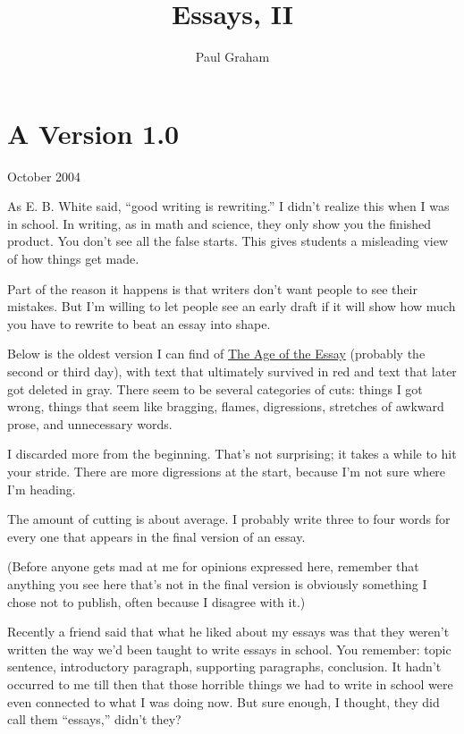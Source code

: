 \documentclass[12pt]{book}
\title{Essays, II}
\author{Paul Graham}
\date{}
\begin{document}
\frontmatter
\maketitle
\tableofcontents
\clearpage
\mainmatter

\chapter{A Version 1.0}

October 2004

As E. B. White said, ``good writing is rewriting.'' I didn't realize
this when I was in school. In writing, as in math and science, they only
show you the finished product. You don't see all the false starts. This
gives students a misleading view of how things get made.

Part of the reason it happens is that writers don't want people to see
their mistakes. But I'm willing to let people see an early draft if it
will show how much you have to rewrite to beat an essay into shape.

Below is the oldest version I can find of \href{essay.html}{The Age of
the Essay} (probably the second or third day), with text that ultimately
survived in red and text that later got deleted in gray. There seem to
be several categories of cuts: things I got wrong, things that seem like
bragging, flames, digressions, stretches of awkward prose, and
unnecessary words.

I discarded more from the beginning. That's not surprising; it takes a
while to hit your stride. There are more digressions at the start,
because I'm not sure where I'm heading.

The amount of cutting is about average. I probably write three to four
words for every one that appears in the final version of an essay.

(Before anyone gets mad at me for opinions expressed here, remember that
anything you see here that's not in the final version is obviously
something I chose not to publish, often because I disagree with it.)

Recently a friend said that what he liked about my essays was that they
weren't written the way we'd been taught to write essays in school. You
remember: topic sentence, introductory paragraph, supporting paragraphs,
conclusion. It hadn't occurred to me till then that those horrible
things we had to write in school were even connected to what I was doing
now. But sure enough, I thought, they did call them ``essays,'' didn't
they?
\end{document}
